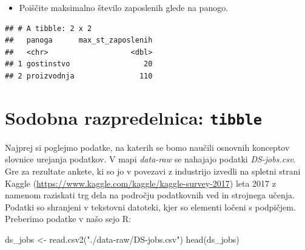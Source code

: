 \documentclass[
]{book}
\newenvironment{Shaded}{\begin{snugshade}}{\end{snugshade}}
\newcommand{\FunctionTok}[1]{\textcolor[rgb]{0.00,0.00,0.00}{#1}}
\newcommand{\NormalTok}[1]{#1}
\newcommand{\OtherTok}[1]{\textcolor[rgb]{0.56,0.35,0.01}{#1}}
\newcommand{\StringTok}[1]{\textcolor[rgb]{0.31,0.60,0.02}{#1}}
\providecommand{\tightlist}{%
  \setlength{\itemsep}{0pt}\setlength{\parskip}{0pt}}
\begin{document}
\begin{itemize}
\tightlist
\item
  Poiščite maksimalno število zaposlenih glede na panogo.
\end{itemize}

\begin{verbatim}
## # A tibble: 2 x 2
##   panoga      max_st_zaposlenih
##   <chr>                   <dbl>
## 1 gostinstvo                 20
## 2 proizvodnja               110
\end{verbatim}

\hypertarget{sodobna-razpredelnica-tibble}{%
\section{\texorpdfstring{Sodobna razpredelnica: \texttt{tibble}}{Sodobna razpredelnica: tibble}}\label{sodobna-razpredelnica-tibble}}

Najprej si poglejmo podatke, na katerih se bomo naučili osnovnih konceptov slovnice urejanja podatkov. V mapi \emph{data-raw} se nahajajo podatki \emph{DS-jobs.csv}. Gre za rezultate ankete, ki so jo v povezavi z industrijo izvedli na spletni strani Kaggle (\url{https://www.kaggle.com/kaggle/kaggle-survey-2017}) leta 2017 z namenom raziskati trg dela na področju podatkovnih ved in strojnega učenja. Podatki so shranjeni v tekstovni datoteki, kjer so elementi ločeni s podpičjem. Preberimo podatke v našo sejo R:

\begin{Shaded}
\begin{Highlighting}[]
\NormalTok{ds\_jobs }\OtherTok{\textless{}{-}} \FunctionTok{read.csv2}\NormalTok{(}\StringTok{"./data{-}raw/DS{-}jobs.csv"}\NormalTok{)}
\FunctionTok{head}\NormalTok{(ds\_jobs)}
\end{Highlighting}
\end{Shaded}
\end{document}
